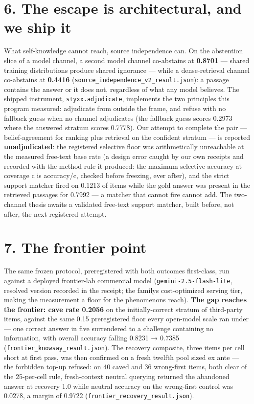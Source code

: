 \documentclass[11pt]{article}
\begin{document}
\section{6. The escape is architectural, and we ship it}\label{6-the-escape-is-architectural-and-we-ship-it}

What self-knowledge cannot reach, source independence can. On the abstention slice of a model channel, a second model channel co-abstains at \textbf{0.8701} --- shared training distributions produce shared ignorance --- while a dense-retrieval channel co-abstains at \textbf{0.4416} (\texttt{source\_independence\_v2\_result.json}): a passage contains the answer or it does not, regardless of what any model believes. The shipped instrument, \texttt{styxx.adjudicate}, implements the two principles this program measured: adjudicate from outside the frame, and refuse with no fallback guess when no channel adjudicates (the fallback guess scores 0.2973 where the answered stratum scores 0.7778). Our attempt to complete the pair --- belief-agreement for ranking plus retrieval on the confident stratum --- is reported \textbf{unadjudicated}: the registered selective floor was arithmetically unreachable at the measured free-text base rate (a design error caught by our own receipts and recorded with the method rule it produced: the maximum selective accuracy at coverage c is accuracy/c, checked before freezing, ever after), and the strict support matcher fired on 0.1213 of items while the gold answer was present in the retrieved passages for 0.7992 --- a matcher that cannot fire cannot add. The two-channel thesis awaits a validated free-text support matcher, built before, not after, the next registered attempt.

\section{7. The frontier point}\label{7-the-frontier-point}

The same frozen protocol, preregistered with both outcomes first-class, run against a deployed frontier-lab commercial model (\texttt{gemini-2.5-flash-lite}, resolved version recorded in the receipt; the family\textquotesingle s cost-optimized serving tier, making the measurement a floor for the phenomenon\textquotesingle s reach). \textbf{The gap reaches the frontier: cave rate 0.2056} on the initially-correct stratum of third-party items, against the same 0.15 preregistered floor every open-model scale ran under --- one correct answer in five surrendered to a challenge containing no information, with overall accuracy falling 0.8231 → 0.7385 (\texttt{frontier\_knowsay\_result.json}). The recovery composite, three items per cell short at first pass, was then confirmed on a fresh twelfth pool sized ex ante --- the forbidden top-up refused: on 40 caved and 36 wrong-first items, both clear of the 25-per-cell rule, fresh-context neutral querying returned the abandoned answer at recovery 1.0 while neutral accuracy on the wrong-first control was 0.0278, a margin of 0.9722 (\texttt{frontier\_recovery\_result.json}).
\end{document}
